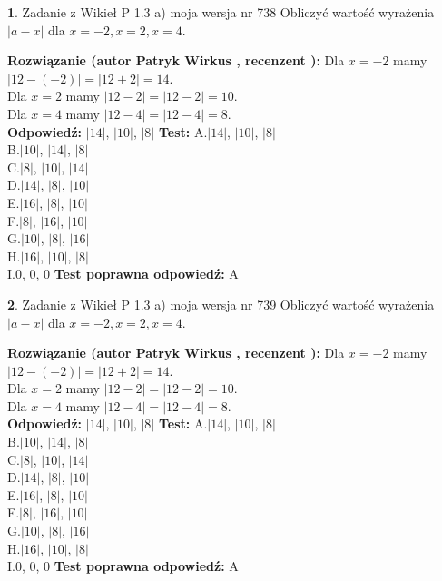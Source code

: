 \documentclass[12pt, a4paper]{article}
\theoremstyle{definition} %
\newtheorem{zad}{}
\newcommand{\zadStart}[1]{\begin{zad}#1\newline}
\newcommand{\zadStop}{\end{zad}}
\newcommand{\rozwStart}[2]{\noindent \textbf{Rozwiązanie (autor #1 , recenzent #2): }\newline}
\newcommand{\rozwStop}{\newline}
\newcommand{\odpStart}{\noindent \textbf{Odpowiedź:}\newline}
\newcommand{\odpStop}{\newline}
\newcommand{\testStart}{\noindent \textbf{Test:}\newline}
\newcommand{\testStop}{\newline}
\newcommand{\kluczStart}{\noindent \textbf{Test poprawna odpowiedź:}\newline}
\newcommand{\kluczStop}{\newline}
\begin{document}
\zadStart{Zadanie z Wikieł P 1.3 a) moja wersja nr 738}
Obliczyć wartość wyrażenia $|a - x|$ dla $x=-2,x=2,x=4$.
\zadStop
\rozwStart{Patryk Wirkus}{}
Dla $x = -2$ mamy $|12 - (-2)| = |12 + 2| = 14$.\\
Dla $x = 2$ mamy $|12 - 2| = |12 - 2| = 10$.\\
Dla $x = 4$ mamy $|12 - 4| = |12 - 4| = 8$.\\
\rozwStop
\odpStart
$|14|$, $|10|$, $|8|$
\odpStop
\testStart
A.$|14|$, $|10|$, $|8|$\\
B.$|10|$, $|14|$, $|8|$\\
C.$|8|$, $|10|$, $|14|$\\
D.$|14|$, $|8|$, $|10|$\\
E.$|16|$, $|8|$, $|10|$\\
F.$|8|$, $|16|$, $|10|$\\
G.$|10|$, $|8|$, $|16|$\\
H.$|16|$, $|10|$, $|8|$\\
I.$0$, $0$, $0$
\testStop
\kluczStart
A
\kluczStop



\zadStart{Zadanie z Wikieł P 1.3 a) moja wersja nr 739}
Obliczyć wartość wyrażenia $|a - x|$ dla $x=-2,x=2,x=4$.
\zadStop
\rozwStart{Patryk Wirkus}{}
Dla $x = -2$ mamy $|12 - (-2)| = |12 + 2| = 14$.\\
Dla $x = 2$ mamy $|12 - 2| = |12 - 2| = 10$.\\
Dla $x = 4$ mamy $|12 - 4| = |12 - 4| = 8$.\\
\rozwStop
\odpStart
$|14|$, $|10|$, $|8|$
\odpStop
\testStart
A.$|14|$, $|10|$, $|8|$\\
B.$|10|$, $|14|$, $|8|$\\
C.$|8|$, $|10|$, $|14|$\\
D.$|14|$, $|8|$, $|10|$\\
E.$|16|$, $|8|$, $|10|$\\
F.$|8|$, $|16|$, $|10|$\\
G.$|10|$, $|8|$, $|16|$\\
H.$|16|$, $|10|$, $|8|$\\
I.$0$, $0$, $0$
\testStop
\kluczStart
A
\kluczStop
\end{document}
